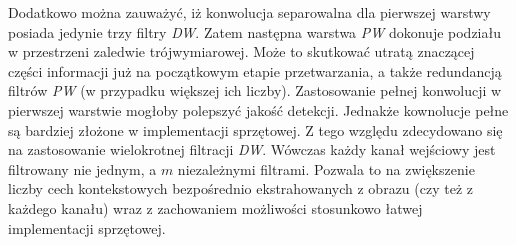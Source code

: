 Dodatkowo można zauważyć, iż konwolucja separowalna dla pierwszej warstwy posiada jedynie trzy filtry \emph{DW}.
Zatem następna warstwa \emph{PW} dokonuje podziału w przestrzeni zaledwie trójwymiarowej. 
Może to skutkować utratą znaczącej części informacji już na początkowym etapie przetwarzania, a także redundancją filtrów \emph{PW} (w przypadku większej ich liczby).
Zastosowanie pełnej konwolucji w pierwszej warstwie mogłoby polepszyć jakość detekcji.
Jednakże kownolucje pełne są bardziej złożone w implementacji sprzętowej. 
Z tego względu zdecydowano się na zastosowanie wielokrotnej filtracji \emph{DW}.
Wówczas każdy kanał wejściowy jest filtrowany nie jednym, a $m$ niezależnymi filtrami.
Pozwala to na zwiększenie liczby cech kontekstowych bezpośrednio ekstrahowanych z obrazu (czy też z każdego kanału) wraz z zachowaniem możliwości stosunkowo łatwej implementacji sprzętowej.

